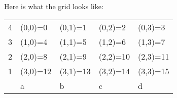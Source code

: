 \documentclass{article}[11pt]
\begin{document}
\vspace{1cm}
$ $\\
Here is what the grid looks like:
\begin{table}[h]
\centering
\begin{tabular}{lllll}
\cline{2-5}
\multicolumn{1}{l|}{4} & \multicolumn{1}{l|}{(0,0)=0}  & \multicolumn{1}{l|}{(0,1)=1}  & \multicolumn{1}{l|}{(0,2)=2}  & \multicolumn{1}{l|}{(0,3)=3}  \\ \cline{2-5} 
\multicolumn{1}{l|}{3} & \multicolumn{1}{l|}{(1,0)=4}  & \multicolumn{1}{l|}{(1,1)=5}  & \multicolumn{1}{l|}{(1,2)=6}  & \multicolumn{1}{l|}{(1,3)=7}  \\ \cline{2-5} 
\multicolumn{1}{l|}{2} & \multicolumn{1}{l|}{(2,0)=8}  & \multicolumn{1}{l|}{(2,1)=9}  & \multicolumn{1}{l|}{(2,2)=10} & \multicolumn{1}{l|}{(2,3)=11} \\ \cline{2-5} 
\multicolumn{1}{l|}{1} & \multicolumn{1}{l|}{(3,0)=12} & \multicolumn{1}{l|}{(3,1)=13} & \multicolumn{1}{l|}{(3,2)=14} & \multicolumn{1}{l|}{(3,3)=15} \\ \cline{2-5} 
                       & a                             & b                             & c                             & d                            
\end{tabular}
\end{table}
\end{document}
